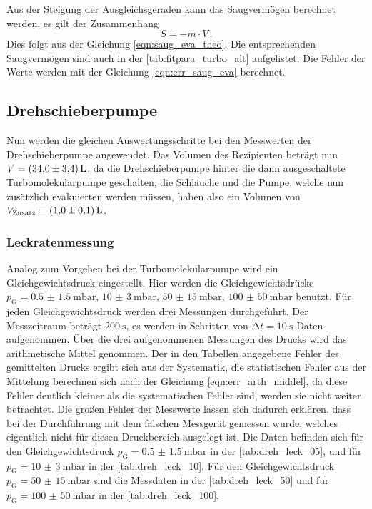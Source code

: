     \noindent Aus der Steigung der Ausgleichsgeraden kann das Saugvermögen berechnet werden, es gilt der Zusammenhang
    \begin{equation*}
      S = - m \cdot V\, .
    \end{equation*}
    Dies folgt aus der Gleichung \eqref{eqn:saug_eva_theo}. Die entsprechenden Saugvermögen sind auch in der \autoref{tab:fitpara_turbo_alt} aufgelistet. 
    Die Fehler der Werte werden mit der Gleichung \eqref{eqn:err_saug_eva} berechnet.

\subsection{Drehschieberpumpe}

    \noindent Nun werden die gleichen Auswertungsschritte bei den Messwerten der Drehschieberpumpe angewendet. Das Volumen des Rezipienten beträgt nun $V = \SI{34 \pm 3.4}{L}$, da die 
    Drehschieberpumpe hinter die dann ausgeschaltete Turbomolekularpumpe geschalten, die Schläuche und die Pumpe, welche nun zusätzlich evakuierten werden müssen, haben also ein Volumen von $V_\text{Zusatz} = \SI{1.0 \pm 0.1}{L}$. 

    \subsubsection{Leckratenmessung}

    \noindent Analog zum Vorgehen bei der Turbomolekularpumpe wird ein Gleichgewichtsdruck eingestellt. Hier werden die
    Gleichgewichtsdrücke $p_\text{G} = \SI{0.5(15)}{\milli\bar}$, $\SI{10(3)}{\milli\bar}$, $\SI{50(15)}{\milli\bar}$, $\SI{100(50)}{\milli\bar}$ benutzt. Für jeden Gleichgewichtsdruck werden 
    drei Messungen durchgeführt. Der Messzeitraum beträgt $\SI{200}{\second}$, es werden in Schritten von $\increment t = \SI{10}{\second}$ Daten aufgenommen. Über die drei aufgenommenen
    Messungen des Drucks wird das arithmetische Mittel genommen. Der in den Tabellen angegebene Fehler des gemittelten Drucks ergibt sich aus der Systematik, die statistischen Fehler aus der 
    Mittelung berechnen sich nach der Gleichung \eqref{eqn:err_arth_middel}, da diese Fehler deutlich kleiner als die systematischen Fehler sind, werden sie nicht weiter betrachtet.
    Die großen Fehler der Messwerte lassen sich dadurch erklären, dass bei der Durchführung mit dem falschen Messgerät gemessen wurde, welches eigentlich nicht für diesen Druckbereich ausgelegt ist. 
    Die Daten befinden sich für den Gleichgewichtsdruck $p_\text{G} = \SI{0.5(15)}{\milli\bar}$ in der \autoref{tab:dreh_leck_05}, und für $p_\text{G} = \SI{10(3)}{\milli\bar}$ in der 
    \autoref{tab:dreh_leck_10}. Für den Gleichgewichtsdruck $p_\text{G} = \SI{50(15)}{\milli\bar}$ sind die Messdaten in der \autoref{tab:dreh_leck_50} und für $p_\text{G} = \SI{100(50)}{\milli\bar}$
    in der \autoref{tab:dreh_leck_100}.

